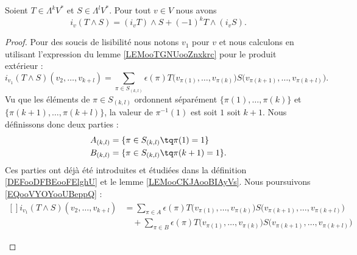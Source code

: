 \begin{proposition}		\label{PROPooYCRXooSOsqCb}
	Soient \( T\in \Lambda^kV^*\) et \( S\in \Lambda^lV^*\). Pour tout \( v\in V\) nous avons
	\begin{equation}		\label{EQooGMHPooBjTtly}
		i_v(T\wedge S)=(i_vT)\wedge S+(-1)^kT\wedge(i_vS).
	\end{equation}
\end{proposition}

\begin{proof}
	Pour des soucis de lisibilité nous notons \( v_1\) pour \( v\) et nous calculons en utilisant l'expression du lemme \ref{LEMooTGNUooZnxkrc} pour le produit extérieur :
	\begin{equation}		\label{EQooVYOYooUBeppQ}
		i_{v_1}(T\wedge S)(v_2,\ldots,v_{k+l})  =\sum_{\pi\in S_{(k,l)}}\epsilon(\pi)T\big( v_{\pi(1)},\ldots,v_{\pi(k)} \big)S\big( v_{\pi(k+1)},\ldots,v_{\pi(k+l)} \big).
	\end{equation}
	Vu que les éléments de \( \pi\in S_{(k,l)}\) ordonnent séparément \( \{ \pi(1),\ldots,\pi(k) \}\) et \( \{ \pi(k+1),\ldots,\pi(k+l) \}\), la valeur de \( \pi^{-1}(1)\) est soit \( 1\) soit \( k+1\). Nous définissons donc deux parties :
	\begin{subequations}
		\begin{align}
			A_{(k,l)} & =\{ \pi\in S_{(k,l)}\tq \pi(1)=1 \}    \\
			B_{(k,l)} & =\{ \pi\in S_{(k,l)}\tq \pi(k+1)=1 \}.
		\end{align}
	\end{subequations}
	Ces parties ont déjà été introduites et étudiées dans la définition \ref{DEFooDFBEooFElghU} et le lemme \ref{LEMooCKJAooBIAyVs}. Nous poursuivons \eqref{EQooVYOYooUBeppQ} :
	\begin{equation}		\label{EQooHZYQooHxoAYB}
		\begin{aligned}[]
			i_{v_1}(T\wedge S)(v_2,\ldots,v_{k+l}) & =\sum_{\pi\in A}\epsilon(\pi)T\big( v_{\pi(1)},\ldots,v_{\pi(k)} \big)S\big( v_{\pi(k+1)},\ldots,v_{\pi(k+l)} \big)       \\
			                                       & \quad +\sum_{\pi\in B}\epsilon(\pi)T\big( v_{\pi(1)},\ldots,v_{\pi(k)} \big)S\big( v_{\pi(k+1)},\ldots,v_{\pi(k+l)} \big)
		\end{aligned}
	\end{equation}
	\begin{subproof}

\end{subproof}
\end{proof}
